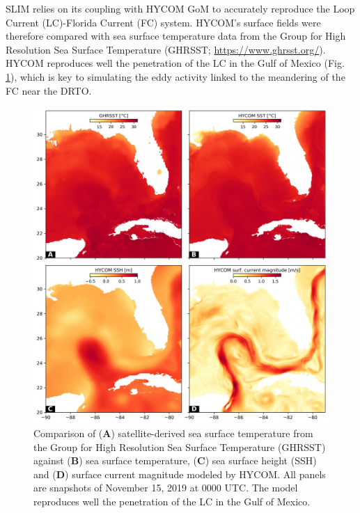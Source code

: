 \begin{subappendices}
	SLIM relies on its coupling with HYCOM GoM to accurately reproduce the Loop Current (LC)-Florida Current (FC) system. HYCOM’s surface fields were therefore compared with sea surface temperature data from the Group for High Resolution Sea Surface Temperature (GHRSST; \url{https://www.ghrsst.org/}). HYCOM reproduces well the penetration of the LC in the Gulf of Mexico (Fig. \ref{fig:a4}), which is key to simulating the eddy activity linked to the meandering of the FC near the DRTO.
	
		\begin{figure}
		\centering
		\includegraphics[width=\textwidth]{chapters/drto/figures/a4.JPEG}
		\caption{Comparison of (\textbf{A}) satellite-derived sea surface temperature from the Group for High Resolution Sea Surface Temperature (GHRSST) against (\textbf{B}) sea surface temperature, (\textbf{C}) sea surface height (SSH) and (\textbf{D}) surface current magnitude modeled by HYCOM. All panels are snapshots of November 15, 2019 at 0000 UTC.  The model reproduces well the penetration of the LC in the Gulf of Mexico.}
		\label{fig:a4}
	\end{figure}
	
\end{subappendices}
